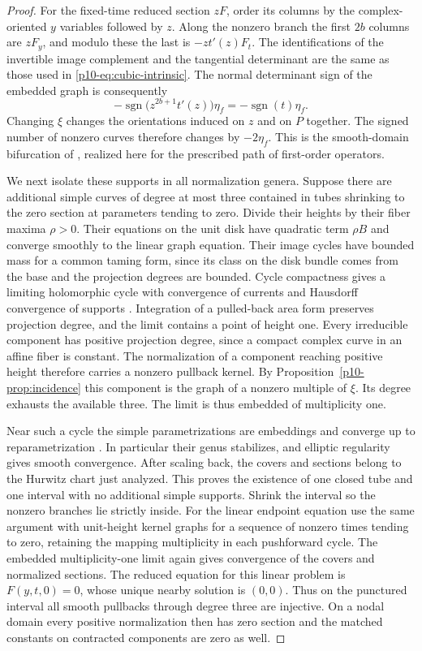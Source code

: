 \begin{proof}
For the fixed-time reduced section $zF$, order its columns by the
complex-oriented $y$ variables followed by $z$. Along the nonzero
branch the first $2b$ columns are $zF_y$, and modulo these the last
is $-zt'(z)F_t$. The identifications of the invertible image
complement and the tangential determinant are the same as those
used in \eqref{p10-eq:cubic-intrinsic}. The normal determinant sign of
the embedded graph is consequently
\[
             -\operatorname{sgn}\bigl(z^{2b+1}t'(z)\bigr)\eta_f
                    =-\operatorname{sgn}(t)\eta_f .
\]
Changing $\xi$ changes the orientations induced on $z$ and on $P$
together. The signed number of nonzero curves therefore changes by
$-2\eta_f$. This is the smooth-domain bifurcation of
\cite[Theorem~4.12(ii)]{bai}, realized here for the prescribed path
of first-order operators.

We next isolate these supports in all normalization genera. Suppose
there are additional simple curves of degree at most three contained
in tubes shrinking to the zero section at parameters tending to zero.
Divide their heights by their fiber maxima $\rho>0$. Their equations
on the unit disk have quadratic term $\rho B$ and converge smoothly
to the linear graph equation. Their image cycles have bounded mass
for a common taming form, since its class on the disk bundle comes
from the base and the projection degrees are bounded. Cycle compactness
gives a limiting holomorphic cycle with convergence of currents and
Hausdorff convergence of supports \cite[Theorem~2.11]{diw}. Integration
of a pulled-back area form preserves projection degree, and the limit
contains a point of height one. Every irreducible component has
positive projection degree, since a compact complex curve in an
affine fiber is constant. The normalization of a component reaching
positive height therefore carries a nonzero pullback kernel. By
Proposition~\ref{p10-prop:incidence} this component is the graph of a
nonzero multiple of $\xi$. Its degree exhausts the available three.
The limit is thus embedded of multiplicity one.

Near such a cycle the simple parametrizations are embeddings and
converge up to reparametrization
\cite[Theorem~2.20 and Proposition~2.21]{diw}. In particular their
genus stabilizes, and elliptic regularity gives smooth convergence.
After scaling back, the covers and sections belong to the Hurwitz
chart just analyzed. This proves the existence of one closed tube
and one interval with no additional simple supports. Shrink the
interval so the nonzero branches lie strictly inside. For the linear
endpoint equation use the same argument with unit-height kernel
graphs for a sequence of nonzero times tending to zero, retaining the
mapping multiplicity in each pushforward cycle. The embedded
multiplicity-one limit again gives convergence of the covers and
normalized sections. The reduced equation for this linear problem is
$F(y,t,0)=0$, whose unique nearby solution is $(0,0)$. Thus on
the punctured interval all smooth pullbacks through degree three are
injective. On a nodal domain every positive normalization then has
zero section and the matched constants on contracted components are
zero as well.


\end{proof}

